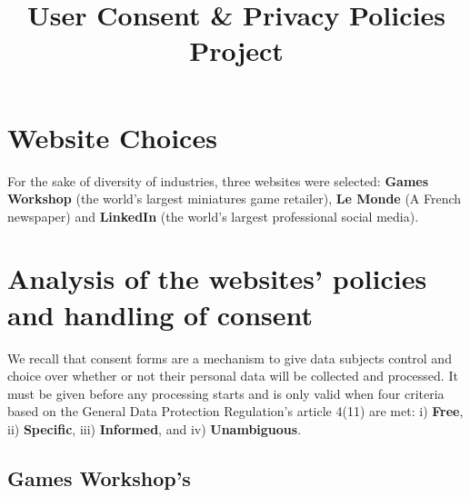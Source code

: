 \documentclass[twocolumn, letterpaper]{scrartcl}
\begin{document}
    \title{\color{seablue}User Consent \& Privacy Policies Project}

	\maketitle
	
    
    
    \section*{Website Choices}
        
         For the sake of diversity of industries, three websites were selected: \textbf{Games Workshop}\cite{GW} (the world's largest miniatures game retailer), \textbf{Le Monde}\cite{LM} (A French newspaper) and \textbf{LinkedIn}\cite{LD} (the world's largest professional social media).
	
	\section{Analysis of the websites' policies and handling of consent}
	
	    We recall that consent forms are a mechanism to give data subjects control and choice over whether or not their personal data will be collected and processed. It must be given before any processing starts and is only valid when four criteria based on the General Data Protection Regulation's article 4(11) are met: i) \textbf{Free}, ii) \textbf{Specific}, iii) \textbf{Informed}, and iv) \textbf{Unambiguous}.
	
    \subsection*{Games Workshop's}
\end{document}
